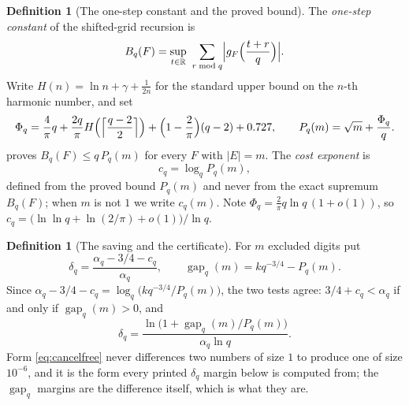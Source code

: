 \documentclass[11pt]{amsart}
\theoremstyle{definition}
\newtheorem{definition}[theorem]{Definition}
\theoremstyle{remark}
\begin{document}
\begin{definition}[The one-step constant and the proved bound]
\label{def:const}
The \emph{one-step constant} of the shifted-grid recursion is
\[
  B_q(F) = \sup_{t \in \mathbb R} \ \sum_{r \bmod q} \Bigl| g_F\Bigl(\frac{t+r}{q}\Bigr) \Bigr| .
\]
Write $H(n) = \ln n + \gamma + \frac{1}{2n}$ for the standard upper bound on the $n$-th harmonic number, and set
\[
  \Phi_q = \frac{4}{\pi} q + \frac{2q}{\pi} H\Bigl( \Bigl\lceil \frac{q-2}{2} \Bigr\rceil \Bigr) + \Bigl( 1 - \frac{2}{\pi} \Bigr)(q-2) + 0.727,
  \qquad
  P_q(m) = \sqrt m + \frac{\Phi_q}{q} .
\]
 proves $B_q(F) \le q\,P_q(m)$ for every $F$ with $|E| = m$. The \emph{cost exponent} is
\[
  c_q = \log_q P_q(m),
\]
defined from the proved bound $P_q(m)$ and never from the exact supremum $B_q(F)$; when $m$ is not $1$ we write $c_q(m)$. Note $\Phi_q = \frac{2}{\pi} q \ln q\,(1 + o(1))$, so $c_q = \bigl(\ln\ln q + \ln(2/\pi) + o(1)\bigr)/\ln q$.
\end{definition}

\begin{definition}[The saving and the certificate]
\label{def:saving}
For $m$ excluded digits put
\[
  \delta_q = \frac{\alpha_q - 3/4 - c_q}{\alpha_q},
  \qquad
  \operatorname{gap}_q(m) = k q^{-3/4} - P_q(m) .
\]
Since $\alpha_q - 3/4 - c_q = \log_q\bigl(k q^{-3/4} / P_q(m)\bigr)$, the two tests agree: $3/4 + c_q < \alpha_q$ if and only if $\operatorname{gap}_q(m) > 0$, and
\begin{equation}
  \label{eq:cancelfree}
  \delta_q = \frac{\ln\bigl(1 + \operatorname{gap}_q(m)/P_q(m)\bigr)}{\alpha_q \ln q} .
\end{equation}
Form \eqref{eq:cancelfree} never differences two numbers of size $1$ to produce one of size $10^{-6}$, and it is the form every printed $\delta_q$ margin below is computed from; the $\operatorname{gap}_q$ margins are the difference itself, which is what they are.
\end{definition}
\end{document}
